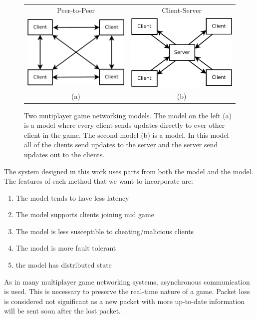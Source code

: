 	
\begin{figure}[ht]
	\centering
	\begin{tabular}{c c}
		Peer-to-Peer & Client-Server \\
		\includegraphics[width=0.48\linewidth]{../images/p2p-model-crop.pdf} &
		\includegraphics[width=0.48\linewidth]{../images/client-server-model-crop.pdf} \\
		(a) & (b)
	\end{tabular}

	\caption{\label{figure:p2p-vs-ClientServer} Two mutiplayer game networking models. The model on the left (a) is a \ptoP model where every client sends updates directly to ever other client in the game. The second model (b) is a \clientServer model. In this model all of the clients send updates to the server and the server send updates out to the clients.}
	\end{figure}
	
	The system designed in this work uses parts from both the \ptoP model and the \clientServer model. The features of each method that we want to incorporate are:
	\begin{enumerate}
		\item The \clientServer model tends to have less latency
		\item The \clientServer model supports clients joining mid game
		\item The \clientServer model is less susceptible to cheating/malicious clients
		\item The \ptoP model is more fault tolerant
		\item the \ptoP model has distributed state
	\end{enumerate}
	
	As in many multiplayer game networking systems, asynchronous communication is used. This is necessary to preserve the real-time nature of a game. Packet loss is considered not significant as a new packet with more up-to-date information will be sent soon after the lost packet.
	
